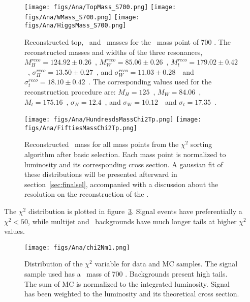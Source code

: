 \begin{figure}[!Hhtbp]
  \begin{center}
    \texttt{[image: figs/Ana/TopMass\_S700.png]}
    \texttt{[image: figs/Ana/WMass\_S700.png]}
    \texttt{[image: figs/Ana/HiggsMass\_S700.png]}
    \caption{Reconstructed top, \W~and \Hb~masses for the \Tp~mass point of 700 \GeVcc. The reconstructed masses and widths of the three resonances, $M^{reco}_{H}=124.92\pm0.26$~\GeVcc, $M^{reco}_{W}=85.06\pm0.26$~\GeVcc, $M^{reco}_{t}=179.02\pm0.42$~\GeVcc, $\sigma^{reco}_{H}=13.50\pm0.27$~\GeVcc, and $\sigma^{reco}_{W}=11.03\pm0.28$~\GeVcc~and $\sigma^{reco}_{t}=18.10\pm0.42$~\GeVcc. The corresponding values used for the reconstruction procedure are: $M_{H}=125$~\GeVcc, $M_{W}=84.06$~\GeVcc, $M_{t}=175.16$~\GeVcc, $\sigma_{H}=12.4$~\GeVcc, and $\sigma_{W}=10.12$~\GeVcc~and $\sigma_{t}=17.35$~\GeVcc.}
    \label{fig:WHt}
  \end{center}
\end{figure}

\begin{figure}[!Hhtbp]
  \begin{center}
    \texttt{[image: figs/Ana/HundresdsMassChi2Tp.png]}
    \texttt{[image: figs/Ana/FiftiesMassChi2Tp.png]}
    \caption{Reconstructed \Tp~mass for all mass points from the $\chi^{2}$ sorting algorithm after basic selection. Each mass point is normalized to luminosity and its corresponding cross section. A gaussian fit of these distributions will be presented afterward in section~\ref{sec:finalsel}, accompanied with a discussion about the resolution on the reconstruction of the \Tp.}
    \label{fig:RecT}
  \end{center}
\end{figure}

The $\chi^{2}$ distribution is plotted in figure~\ref{fig:chi2}. Signal events have preferentially a $\chi^{2}<50$, while multijet and \ttbar~backgrounds have much longer tails at higher $\chi^{2}$ values.

\begin{figure}[!Hhtbp]
  \begin{center}
    \texttt{[image: figs/Ana/chi2Nm1.png]}
    \caption{Distribution of the $\chi^{2}$ variable for data and MC samples. The signal sample used has a \Tp~mass of 700 \GeVcc. Backgrounds present high tails. The sum of MC is normalized to the integrated luminosity. Signal has been weighted to the luminosity and its theoretical cross section.}
    \label{fig:chi2}
  \end{center}
\end{figure}

